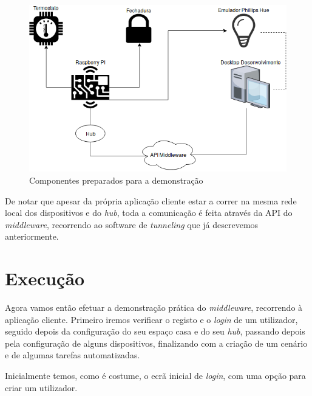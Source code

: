 \begin{figure}[H]
  \centering
        \includegraphics[scale=0.6]{img/demo/setup.png}
  \caption{Componentes preparados para a demonstração}
  \label{fig:demo-setup}
\end{figure}

De notar que apesar da própria aplicação cliente estar a correr na mesma rede local dos dispositivos e do \textit{hub}, toda a comunicação é feita através da API do \textit{middleware}, recorrendo ao software de \textit{tunneling} que já descrevemos anteriormente.

\section{Execução}

Agora vamos então efetuar a demonstração prática do \textit{middleware}, recorrendo à aplicação cliente. Primeiro iremos verificar o registo e o \textit{login} de um utilizador, seguido depois da configuração do seu espaço casa e do seu \textit{hub}, passando depois pela configuração de alguns dispositivos, finalizando com a criação de um cenário e de algumas tarefas automatizadas.

Inicialmente temos, como é costume, o ecrã inicial de \textit{login}, com uma opção para criar um utilizador.

